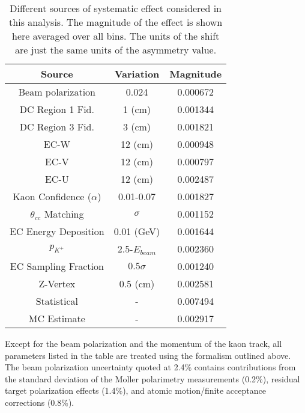 \begin{table}
  \centering
  \begin{tabular}{c|c|c}
    Source                     & Variation & Magnitude \\ 
    \hline
    Beam polarization          & 0.024          & 0.000672 \\ 
    DC Region 1 Fid.           & 1 (cm)         & 0.001344 \\ 
    DC Region 3 Fid.           & 3 (cm)         & 0.001821 \\
    EC-W                       & 12 (cm)        & 0.000948 \\ 
    EC-V                       & 12 (cm)        & 0.000797 \\
    EC-U                       & 12 (cm)        & 0.002487 \\
    Kaon Confidence ($\alpha$) & 0.01-0.07      & 0.001827 \\
    $\theta_{cc}$ Matching     & $\sigma$       & 0.001152 \\
    EC Energy Deposition       & 0.01 (GeV)     & 0.001644 \\
    $p_{K^+}$                  & 2.5-$E_{beam}$ & 0.002360 \\ 
    EC Sampling Fraction       & $0.5 \sigma$   & 0.001240 \\
    Z-Vertex                   & 0.5 (cm)       & 0.002581 \\
    \hline 
    Statistical                & -              & 0.007494 \\ 
    \hline
    MC Estimate                & -              & 0.002917
  \end{tabular}
  \caption{Different sources of systematic effect considered in this analysis.  The magnitude of the effect is shown here averaged over all bins.  The units of the shift are just the same units of the asymmetry value. }
  \label{table:kaon-systematics}
\end{table}


Except for the beam polarization and the momentum of the kaon track, all parameters listed in the table are treated using the formalism outlined above.  The beam polarization uncertainty quoted at 2.4\% contains contributions from the standard deviation of the Moller polarimetry measurements (0.2\%), residual target polarization effects (1.4\%), and atomic motion/finite acceptance corrections (0.8\%).\\

